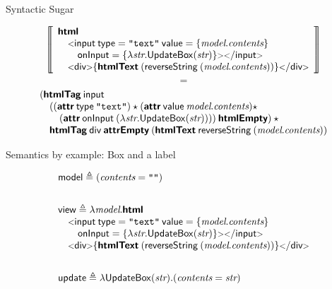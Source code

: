 \documentclass[11.5pt, aspectratio=169]{beamer}
\begin{document}
\begin{frame}{Syntactic Sugar}

    \[
      \left\llbracket
    \begin{array}{l}
      \calcwd{html} \\
      \quad \opentag{input} \: \attribute{type}=\textnode{"text"} \:
      \attribute{value} = \{ \var{model}.\var{contents} \} \\
      \qquad
        \attribute{onInput} = \{ \lambda \textit{str}.
          \mkwd{UpdateBox}(\textit{str})\} \closetag \tagzeroend{input}  \\
        \quad \htmltagzero{div}{\antiquote{\htmltext{(\metadef{reverseString} \:
        (\textit{model}. \textit{contents}))}}}
    \end{array}
    \right\rrbracket
  \]%
  \vspace{0.25em}
  {\Huge
  \[
    =
  \]%
}
  \[
    \begin{array}{l}
        (\textbf{\textsf{htmlTag}} \: \textsf{input} \\
        \quad ((\textbf{\textsf{attr}} \: \mathsf{type} \: \texttt{"text"}) \star
        (\textbf{\textsf{attr}} \: \mathsf{value} \: \textit{model}.\textit{contents}) \star \\
         \qquad
         (\textbf{\textsf{attr}} \: \mathsf{onInput} \: (\lambda \textit{str}.
         \mathsf{UpdateBox}(\textit{str})))) \: \textbf{\textsf{htmlEmpty}}) \: \star \\
         \quad
         \textbf{\textsf{htmlTag}} \: \textsf{div} \: \textbf{\textsf{attrEmpty}} \: (\textbf{\textsf{htmlText}} \: \mathsf{reverseString} \:
         (\textit{model}.\textit{contents}))
    \end{array}
  \]
\end{frame}

%

\begin{frame}{Semantics by example: Box and a label}

  \large
\[
      \bl
      \mkwd{model} \defeq (\var{contents} = \textnode{""}) \vspace{2em} \\
      \mkwd{view} \defeq \lambda \textit{model} . \calcwd{html} \\
      \quad \opentag{input} \: \attribute{type}=\textnode{"text"} \:
      \attribute{value} = \{ \var{model}.\var{contents} \} \\
      \qquad
        \attribute{onInput} = \{ \lambda \textit{str}.
          \mkwd{UpdateBox}(\textit{str})\} \closetag \tagzeroend{input}  \\
        \quad \htmltagzero{div}{\antiquote{\htmltext{(\metadef{reverseString} \:
        (\textit{model}. \textit{contents}))}}} \vspace{2em} \\
        \mkwd{update} \defeq \lambda \mkwd{UpdateBox}(\var{str}) . (\var{contents} = \var{str})
      \el
    \]
\end{frame}
\end{document}
